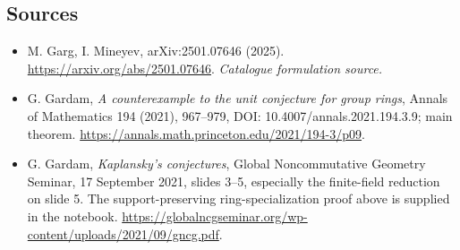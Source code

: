 \documentclass[11pt,a4paper]{article}
\begin{document}
\subsection{Sources}
\begin{itemize}\raggedright
\item[\textnormal{[S1]}]\hypertarget{source:30006789:1}{} M. Garg, I. Mineyev, arXiv:2501.07646 (2025).
\url{https://arxiv.org/abs/2501.07646}.
{\small\textit{Catalogue formulation source.}}
\item[\textnormal{[E1]}]\hypertarget{extra:30006789:1}{}
G. Gardam, \emph{A counterexample to the unit conjecture for group rings},
Annals of Mathematics 194 (2021), 967--979,
DOI: 10.4007/annals.2021.194.3.9; main theorem.
\url{https://annals.math.princeton.edu/2021/194-3/p09}.
\item[\textnormal{[E2]}]\hypertarget{extra:30006789:2}{}
G. Gardam, \emph{Kaplansky's conjectures}, Global Noncommutative Geometry
Seminar, 17 September 2021, slides 3--5, especially the finite-field
reduction on slide 5. The support-preserving ring-specialization proof
above is supplied in the notebook.
\url{https://globalncgseminar.org/wp-content/uploads/2021/09/gncg.pdf}.
\end{itemize}
\end{document}
